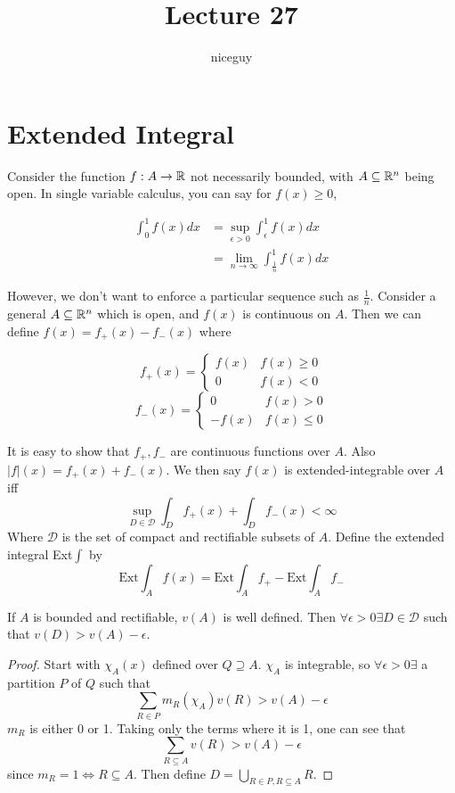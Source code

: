 \documentclass[12pt]{article}
\title{Lecture 27}
\author{niceguy}
\begin{document}
\maketitle

\section{Extended Integral}

Consider the function $f:A \rightarrow \mathbb{R}$ not necessarily bounded, with $A \subseteq \mathbb{R}^n$ being open. In single variable calculus, you can say for $f(x) \geq 0$,

\begin{align*}
    \int_0^1 f(x)dx &= \sup_{\epsilon>0} \int_\epsilon^1 f(x)dx \\
                    &= \lim_{n\rightarrow\infty} \int_{\frac{1}{n}}^1 f(x)dx
\end{align*}

However, we don't want to enforce a particular sequence such as $\frac{1}{n}$. Consider a general $A \subseteq \mathbb{R}^n$ which is open, and $f(x)$ is continuous on $A$. Then we can define $f(x) = f_+(x) - f_-(x)$ where

$$f_+(x) = \begin{cases} f(x) & f(x) \geq 0 \\ 0 & f(x) < 0 \end{cases}$$
$$f_-(x) = \begin{cases} 0 & f(x) > 0 \\ -f(x) & f(x) \leq 0 \end{cases}$$

It is easy to show that $f_+,f_-$ are continuous functions over $A$. Also $|f|(x) = f_+(x) + f_-(x)$. We then say $f(x)$ is extended-integrable over $A$ iff
$$\sup_{D \in \mathcal D} \int_D f_+(x) + \int_D f_-(x) < \infty$$
Where $\mathcal D$ is the set of compact and rectifiable subsets of $A$. Define the extended integral Ext$\int$ by
$$\text{Ext}\int_Af(x) = \text{Ext}\int_Af_+ - \text{Ext}\int_Af_-$$

\begin{rem}
    If $A$ is bounded and rectifiable, $v(A)$ is well defined. Then $\forall \epsilon > 0 \exists D \in \mathcal D$ such that $v(D) > v(A) - \epsilon$.
\end{rem}

\begin{proof}
    Start with $\chi_A(x)$ defined over $Q \supseteq A$. $\chi_A$ is integrable, so $\forall \epsilon > 0 \exists$ a partition $P$ of $Q$ such that
    $$\sum_{R \in P} m_R(\chi_A)v(R) > v(A) - \epsilon$$
    $m_R$ is either 0 or 1. Taking only the terms where it is 1, one can see that
    $$\sum_{R\subseteq A} v(R) > v(A) - \epsilon$$
    since $m_R = 1 \Leftrightarrow R \subseteq A$. Then define $D = \bigcup_{R\in P, R \subseteq A} R$.
\end{proof}
\end{document}

